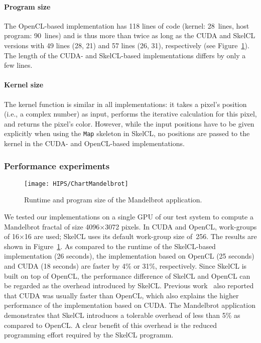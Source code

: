 \paragraph{Program size}
The OpenCL-based implementation has 118 lines of code (kernel: 28~lines, host program: 90~lines) and is thus more than twice as long as the CUDA and SkelCL versions with 49 lines (28, 21) and 57 lines (26, 31), respectively (see Figure~\ref{fig:mandelbrot_runtime}).
The length of the CUDA- and SkelCL-based implementations differs by only a few lines.

\paragraph{Kernel size}
The kernel function is similar in all implementations: it takes a pixel's position (i.e., a complex number) as input, performs the iterative calculation for this pixel, and returns the pixel's color.
However, while the input positions have to be given explicitly when using the \texttt{Map} skeleton in SkelCL, no positions are passed to the kernel in the CUDA- and OpenCL-based implementations.

\subsubsection{Performance experiments}
\label{sec:mandelbrot:runtime}

\begin{figure}[bp]
    \centering
    \texttt{[image: HIPS/ChartMandelbrot]}
    \caption{Runtime and program size of the Mandelbrot application.}
    \label{fig:mandelbrot_runtime}
\end{figure}%


We tested our implementations on a single GPU of our test system to compute a Mandelbrot fractal of size 4096$\times$3072 pixels.
In CUDA and OpenCL, work-groups of 16$\times$16 are used; SkelCL uses its default work-group size of~256.
The results are shown in Figure~\ref{fig:mandelbrot_runtime}.
As compared to the runtime of the SkelCL-based implementation (26 seconds), the implementation based on OpenCL (25 seconds) and CUDA (18 seconds) are faster by 4\% or 31\%, respectively.
Since SkelCL is built on top of OpenCL, the performance difference of SkelCL and OpenCL can be regarded as the overhead introduced by SkelCL\@.
Previous work~\cite{KoDYLCSMZ-10} also reported that CUDA was usually faster than OpenCL, which also explains the higher performance of the implementation based on CUDA.
The Mandelbrot application demonstrates that SkelCL introduces a tolerable overhead of less than 5\% as compared to OpenCL.
A clear benefit of this overhead is the reduced programming effort required by the SkelCL programm.


